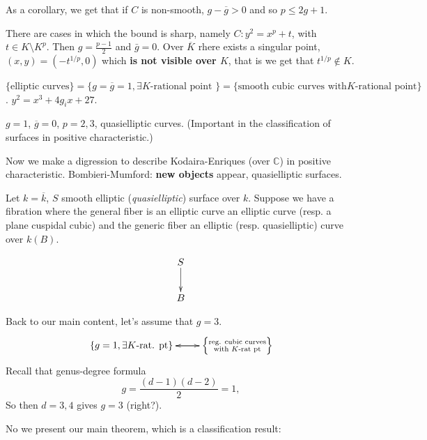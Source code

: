 As a corollary, we get that if $C$ is
non-smooth,
$g-\overline{g}>0$ and so $p \leq  2g+1$.

\begin{example}
\label{example-attain}
There are cases in which the bound is sharp,
namely $C:y^2=x^p+t$, with $t \in K\setminus
K^p$.
Then $g=\frac{p-1}{2}$ and $\bar{g}=0$.
Over $\overline{K}$ rhere exists a singular
point,
$(x,y)=(-t^{1/p},0)$ which
{\bf is not visible over $K$}, that is we get
that
$t^{1/p}\not \in K$.
\end{example}

\begin{example}
\label{example-elliptic}
$\{\text{elliptic curves}\}=\{g =
\overline{g}=1,\text{$\exists K$-rational
point }\}=\{\text{smooth cubic curves with
$K$-rational point}\}$.
$y^2=x^3+4g_i x+27$.
\end{example}

\begin{example}
\label{example-quasielliptic}
$g=1$, $\overline{g}=0$, $p=2,3$,
quasielliptic curves. (Important in the
classification of surfaces
in positive characteristic.)
\end{example}

\medskip\noindent
Now we make a digression to describe
Kodaira-Enriques (over $\mathbb{C}$)
in positive characteristic. Bombieri-Mumford:
{\bf new objects} appear,
quasielliptic surfaces.

Let $k=\overline{k}$, $S$ smooth elliptic
({\it quasielliptic}) surface over $k$.
Suppose we have a fibration
where the general fiber is an elliptic curve
an elliptic curve (resp. a plane
cuspidal cubic) and the generic fiber an
elliptic (resp. quasielliptic)
curve over $k(B)$.

$$
\xymatrix{
S\ar[d]\\
B
}
$$

\medskip\noindent
Back to our main content, let's assume that
$g=3$.
$$
\xymatrix{
\{g=1,\exists K\text{-rat. pt}\}\ar[r]&\ar[l]
\left\{\substack{\text{reg. cubic curves} \\
\text{with $K$-rat pt}}\right\}
}
$$
Recall that genus-degree formula
$$
g=\frac{(d-1)(d-2)}{2}=1,
$$
So then $d=3,4$ gives  $g=3$ (right?).

No we present our main theorem, which is a
classification result:

